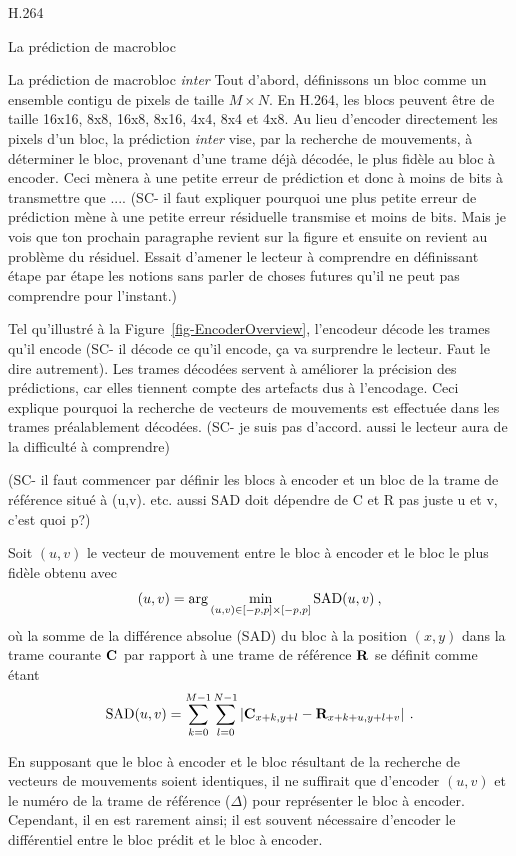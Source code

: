\documentclass{article}
\begin{document}
\begin{section}{H.264}
\begin{subsection}{La prédiction de macrobloc}
\begin{subsubsection}{La prédiction de macrobloc \textit{inter}}
Tout d'abord, définissons un bloc comme un ensemble contigu de pixels de taille
$M \times N$. En H.264, les blocs peuvent être de taille 16x16, 8x8, 16x8, 8x16, 4x4, 8x4 et 4x8. Au lieu d'encoder directement les pixels d'un bloc, la prédiction
\textit{inter} vise, par la recherche de mouvements, à déterminer le bloc,
provenant d'une trame déjà décodée, le plus fidèle au bloc à encoder. Ceci mènera à une petite erreur de prédiction et donc à moins de bits à transmettre que .... (SC- il faut expliquer pourquoi une plus petite erreur de prédiction mène à une petite erreur résiduelle transmise et moins de bits. Mais je vois que ton prochain paragraphe revient sur la figure et ensuite on revient au problème du résiduel. Essait d'amener le lecteur à comprendre en définissant étape par étape les notions sans parler de choses futures qu'il ne peut pas comprendre pour l'instant.)

Tel qu'illustré à la Figure~\ref{fig-EncoderOverview}, l'encodeur décode 
les trames qu'il encode (SC- il décode ce qu'il encode, ça va surprendre le lecteur. Faut le dire autrement). Les trames décodées servent à améliorer la précision 
des prédictions, car elles tiennent compte des artefacts dus à l'encodage. Ceci
explique pourquoi la recherche de vecteurs de mouvements est effectuée dans les
trames préalablement décodées. (SC- je suis pas d'accord. aussi le lecteur aura de la difficulté à comprendre)

(SC- il faut commencer par définir les blocs à encoder et un bloc de la trame de référence situé à (u,v). etc. aussi SAD doit dépendre de C et R pas juste u et v, c'est quoi p?)

Soit $(u,v)$ le vecteur de mouvement entre le bloc à encoder et le bloc le plus
fidèle obtenu avec 
\begin{equation}
\label{eq-Vectors}
(u, v) = \arg \min_{(u,v) \in [-p, p] \times [-p, p]} \textrm{SAD}(u, v)
\:,
\end{equation}
où la somme de la différence absolue (SAD) du bloc à la position $(x,y)$ 
dans la
trame courante $\mathbf{C}_{}$ par rapport à une trame de référence $\mathbf{R}_{}$ se
définit comme étant
\begin{equation}
\textrm{SAD}(u,v) = \sum_{k=0}^{M-1}\sum_{l=0}^{N-1} \left| \mathbf{C}_{x+k,y+l} -
\mathbf{R}_{x+k+u,y+l+v} \right|\:.
\end{equation}

En supposant que le bloc à encoder et le bloc résultant de la recherche de
vecteurs de mouvements soient identiques, il ne suffirait que d'encoder
$(u,v)$ et le numéro de la trame de référence ($\Delta$) pour représenter le
bloc à encoder. Cependant, il en est rarement ainsi; il est souvent nécessaire
d'encoder le différentiel entre le bloc prédit et le bloc à encoder.


\end{subsubsection}
\end{subsection}
\end{section}
\end{document}
